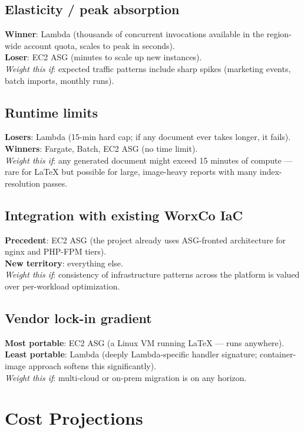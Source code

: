 \documentclass[11pt,letterpaper]{article}
\begin{document}
\subsection{Elasticity / peak absorption}
\textbf{Winner}: Lambda (thousands of concurrent invocations available in the region-wide account quota, scales to peak in seconds).\\
\textbf{Loser}: EC2 ASG (minutes to scale up new instances).\\
\emph{Weight this if}: expected traffic patterns include sharp spikes (marketing events, batch imports, monthly runs).

\subsection{Runtime limits}
\textbf{Losers}: Lambda (15-min hard cap; if any document ever takes longer, it fails).\\
\textbf{Winners}: Fargate, Batch, EC2 ASG (no time limit).\\
\emph{Weight this if}: any generated document might exceed 15 minutes of compute --- rare for LaTeX but possible for large, image-heavy reports with many index-resolution passes.

\subsection{Integration with existing WorxCo IaC}
\textbf{Precedent}: EC2 ASG (the project already uses ASG-fronted architecture for nginx and PHP-FPM tiers).\\
\textbf{New territory}: everything else.\\
\emph{Weight this if}: consistency of infrastructure patterns across the platform is valued over per-workload optimization.

\subsection{Vendor lock-in gradient}
\textbf{Most portable}: EC2 ASG (a Linux VM running LaTeX --- runs anywhere).\\
\textbf{Least portable}: Lambda (deeply Lambda-specific handler signature; container-image approach softens this significantly).\\
\emph{Weight this if}: multi-cloud or on-prem migration is on any horizon.

\newpage

\section{Cost Projections}
\label{sec:cost}
\end{document}
